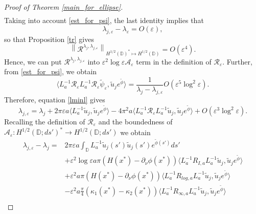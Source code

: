 \documentclass[12pt,a4paper]{amsart}
\numberwithin{equation}{section}
\theoremstyle{plain}
\theoremstyle{definition}
\newcommand{\D}{\mathbb{D}}
\newcommand{\A}{\mathcal A}
\begin{document}
\begin{proof}[Proof of Theorem \ref{main_for_ellipse}]
\begin{multline}
	\end{multline}
    Taking into account \eqref{est_for_psi}, the last identity implies that 
    \begin{equation*}
        \lambda_{j,\varepsilon} - \lambda_\varepsilon = O(\varepsilon),
    \end{equation*}
    so that Proposition \ref{tr} gives
	\begin{equation*}
		\left\| \mathcal{R}^{\lambda_j,\lambda_{j,\varepsilon}}\right\|_{H^{1/2}(\mathbb{D})^* \mapsto H^{1/2}(\mathbb{D})} = O(\varepsilon^4).
	\end{equation*}
    Hence, we can put $\mathcal{R}^{\lambda_j,\lambda_{j,\varepsilon}}$ into $\varepsilon^2\log\varepsilon\mathcal{A}_{\varepsilon}$ term in the definition of $\mathcal{R}_\varepsilon$. Further, from \eqref{est_for_psi}, we obtain
	\begin{equation*}
		\langle L_{a}^{-1}\mathcal{R}_\varepsilon L_{a}^{-1}\mathcal{R}_\varepsilon\tilde{\psi}_\varepsilon, \tilde{u}_je^{\tilde{\phi}}\rangle = \frac{1}{\lambda_j - \lambda_{j,\varepsilon}}O\left(\varepsilon^5\log^2\varepsilon\right).
	\end{equation*}
	Therefore, equation \eqref{lminl} gives
	\begin{equation*}
		\lambda_{j,\varepsilon} = \lambda_j + 2\pi\varepsilon a \langle L_{a}^{-1}\tilde{u}_j, \tilde{u}_je^{\tilde{\phi}} \rangle - 4\pi^2 a \langle L_{a}^{-1}\mathcal{R}_\varepsilon L_{a}^{-1}\tilde{u}_j, \tilde{u}_je^{\tilde{\phi}} \rangle + O(\varepsilon^3\log^2\varepsilon).
	\end{equation*}
	Recalling the definition of $\mathcal{R}_{\varepsilon}$ and the boundedness of $\A_\varepsilon : H^{1/2}(\D; ds')^* \to H^{1/2}(\D; ds')$ we obtain
	\begin{align}\label{lambda minus lambda 1}
		\nonumber\lambda_{j,\varepsilon} - \lambda_j =& 2\pi\varepsilon a \int_{\mathbb{D}} L_a^{-1}\tilde{u}_j(s') \tilde{u}_j(s') e^{\tilde{\phi}(s')} ds'\\
		\nonumber & + \varepsilon^2\log\varepsilon a\pi (H(x^*)-\partial_{\nu}\phi(x^*)) \langle L_a^{-1} R_{I,a} L_a^{-1}\tilde{u}_j, \tilde{u}_je^{\tilde{\phi}} \rangle\\
		&+ \varepsilon^2 a \pi  (H(x^*)-\partial_{\nu}\phi(x^*)) \langle L_a^{-1} R_{log,a} L_a^{-1}\tilde{u}_j, \tilde{u}_je^{\tilde{\phi}} \rangle\\
		\nonumber& - \varepsilon^2 a \frac{\pi}{4} \left(\kappa_1(x^*) -  \kappa_2(x^*)\right) \langle L_a^{-1} R_{\infty,a} L_a^{-1}\tilde{u}_j, \tilde{u}_je^{\tilde{\phi}} \rangle\\

\end{align}
\end{proof}
\end{document}
